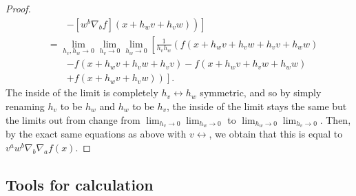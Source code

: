 \begin{thm}
\begin{proof}
\begin{equation}
\begin{split}
& \qquad \left. \left. -[w^b\nabla _bf](x+h_wv+h_vw)\right) \right] \\
& =\lim _{h_v,h_w\to 0}\lim _{h_v\to 0}\lim _{h_w\to 0}\left[ \frac{1}{h_vh_w}\left( f(x+h_wv+h_vw+h_vv+h_ww)\right. \right. \\
& \qquad \left. \left. -f(x+h_wv+h_vw+h_vv)-f(x+h_wv+h_vw+h_ww)\right. \right. \\
& \qquad \left. \left. +f(x+h_wv+h_vw)\right) \right] .
\end{split}
\end{equation}
The inside of the limit is completely $h_v\leftrightarrow h_w$ symmetric, and so by simply renaming $h_v$ to be $h_w$ and $h_w$ to be $h_v$, the inside of the limit stays the same but the limits out from change from $\lim _{h_v\to 0}\lim _{h_w\to 0}$ to $\lim _{h_w\to 0}\lim _{h_v\to 0}$.  Then, by the exact same equations as above with $v\leftrightarrow $, we obtain that this is equal to $v^aw^b\nabla _b\nabla _af(x)$.
\end{proof}
\end{thm}

\subsection{Tools for calculation}

